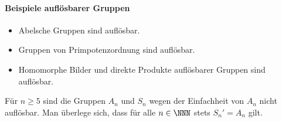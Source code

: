 \documentclass[12pt,a4paper,twoside]{article}
\begin{document}
\paragraph{Beispiele aufl\"osbarer Gruppen}
\begin{itemize}
\item Abelsche Gruppen sind aufl\"osbar.
\item Gruppen von Primpotenzordnung sind aufl\"osbar.
\item Homomorphe Bilder und direkte Produkte aufl\"osbarer Gruppen sind
  aufl\"osbar.
\end{itemize}
\begin{Bemerkung*}
  F\"ur $n\ge5$ sind die Gruppen $A_n$ und $S_n$ wegen der Einfachheit von
  $A_n$ nicht aufl\"osbar. Man \"uberlege sich, dass f\"ur alle $n\in\NNN$
  stets $S_n'=A_n$ gilt.
\end{Bemerkung*}
\end{document}
